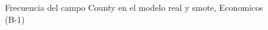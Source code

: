 \begin{figure}[H]
    \centering
    
    \caption{Frecuencia del campo County en el modelo real y smote, Economicos (B-1)}
    \label{frecuency-County-smote-enc}
\end{figure}